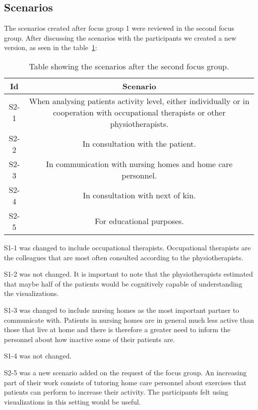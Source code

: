 \subsection{Scenarios}
The scenarios created after focus group 1 were reviewed in the second focus group. After discussing the scenarios with the participants we created a new version, as seen in the table~\ref{tab:scen2}:

\begin{table}[h!]
  \begin{tabular}{|c|c|}
    \hline
    \textbf{Id} & \textbf{Scenario} \\ \hline
    S2-1 & When analysing patients activity level, either individually or in cooperation with occupational therapists or other physiotherapists. \\ \hline
    S2-2 & In consultation with the patient. \\ \hline
    S2-3 & In communication with nursing homes and home care personnel. \\ \hline
    S2-4 & In consultation with next of kin. \\ \hline
    S2-5 & For educational purposes. \\ \hline
  \end{tabular}
  \caption{Table showing the scenarios after the second focus group.}
  \label{tab:scen2}
\end{table}

S1-1 was changed to include occupational therapists. Occupational therapists are the colleagues that are most often consulted according to the physiotherapists. 

S1-2 was not changed. It is important to note that the physiotherapists estimated that maybe half of the patients would be cognitively capable of understanding the visualizations.

S1-3 was changed to include nursing homes as the most important partner to communicate with. Patients in nursing homes are in general much less active than those that live at home and there is therefore a greater need to inform the personnel about how inactive some of their patients are.

S1-4 was not changed.

S2-5 was a new scenario added on the request of the focus group. An increasing part of their work consists of tutoring home care personnel about exercises that patients can perform to increase their activity. The participants felt using visualizations in this setting would be useful. 

